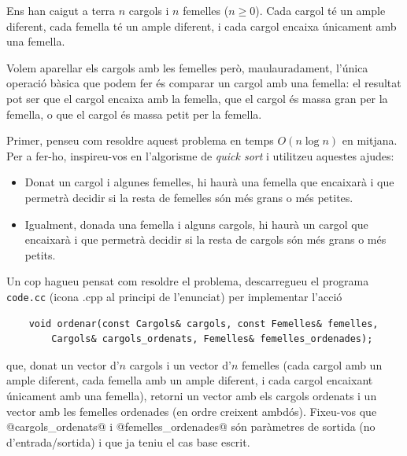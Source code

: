 

\Statement

Ens han caigut a terra $n$ cargols i $n$ femelles ($n\ge0$). Cada cargol té
un ample diferent, cada femella té un ample diferent, i cada cargol encaixa
únicament amb una femella.


\medskip

Volem aparellar els cargols amb les femelles però, maulauradament, l'única
operació bàsica que podem fer és comparar un cargol amb una femella: el
resultat pot ser que el cargol encaixa amb la femella, que el cargol és massa
gran per la femella, o que el cargol és massa petit per la femella.

\medskip

Primer, penseu com resoldre aquest problema en temps $O(n\log n)$ en mitjana.
Per a fer-ho, inspireu-vos en l'algorisme de \emph{quick sort}
i utilitzeu aquestes ajudes:

\begin{itemize}

\item Donat un cargol i algunes femelles, hi haurà una femella que encaixarà i que permetrà decidir si la resta de femelles són més grans o més petites.

\item Igualment, donada una femella i alguns cargols, hi haurà un cargol que encaixarà i que permetrà decidir si la resta de cargols són més grans o més petits.

\end{itemize}

Un cop hagueu pensat com resoldre el problema, descarregueu el programa
\texttt{code.cc} (icona .cpp al principi de l'enunciat)
per implementar l'acció

\begin{lstlisting}
    void ordenar(const Cargols& cargols, const Femelles& femelles,
        Cargols& cargols_ordenats, Femelles& femelles_ordenades);
\end{lstlisting}

que, donat un vector d'$n$ cargols i  un vector d'$n$ femelles (cada cargol
amb un ample diferent, cada femella amb un ample diferent, i cada cargol
encaixant únicament amb una femella), retorni un vector amb els cargols
ordenats i un vector amb les femelles ordenades (en ordre creixent ambdós). Fixeu-vos que @cargols_ordenats@
i @femelles_ordenades@ són paràmetres de sortida (no d'entrada/sortida)
i que ja teniu el cas base escrit.

